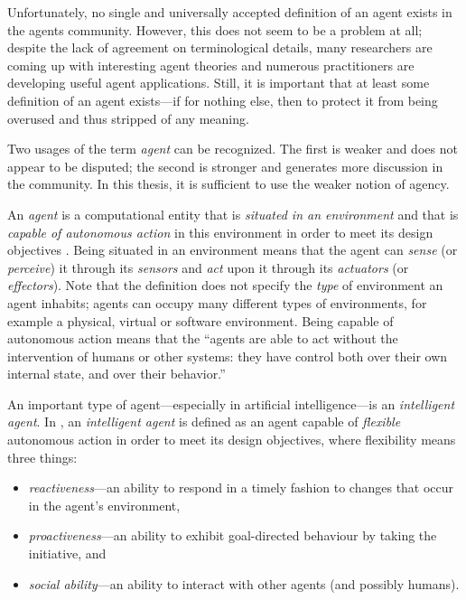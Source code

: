 Unfortunately, no single and universally accepted definition of an agent exists in the agents community.
However, this does not seem to be a problem at all; despite the lack of agreement on terminological details, many researchers are coming up with interesting agent theories and numerous practitioners are developing useful agent applications.
Still, it is important that at least some definition of an agent exists---if for nothing else, then to protect it from being overused and thus stripped of any meaning.

Two usages of the term \textit{agent} can be recognized.
The first is weaker and does not appear to be disputed; the second is stronger and generates more discussion in the community.
In this thesis, it is sufficient to use the weaker notion of agency.

An \textit{agent} is a computational entity that is \textit{situated in an environment} and that is \textit{capable of autonomous action} in this environment in order to meet its design objectives \cite{Wooldridge02}.
Being situated in an environment means that the agent can \textit{sense} (or \textit{perceive}) it through its \textit{sensors} and \textit{act} upon it through its \textit{actuators} (or \textit{effectors}).
Note that the definition does not specify the \textit{type} of environment an agent inhabits; agents can occupy many different types of environments, for example a physical, virtual or software environment.
Being capable of autonomous action means that the ``agents are able to act without the intervention of humans or other systems: they have control both over their own internal state, and over their behavior.'' \cite{Wooldridge02}

An important type of agent---especially in artificial intelligence---is an \textit{intelligent agent}.
In \cite{Wooldridge02}, an \textit{intelligent agent} is defined as an agent capable of \textit{flexible} autonomous action in order to meet its design objectives, where flexibility means three things:
\begin{itemize}
	\item \textit{reactiveness}---an ability to respond in a timely fashion to changes that occur in the agent's environment,
	\item \textit{proactiveness}---an ability to exhibit goal-directed behaviour by taking the initiative, and
	\item \textit{social ability}---an ability to interact with other agents (and possibly humans).
\end{itemize}

